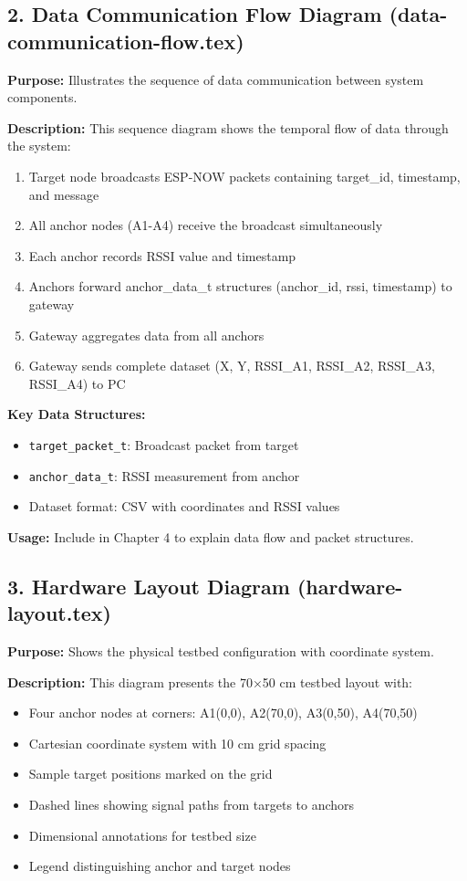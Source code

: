 \subsection*{2. Data Communication Flow Diagram (data-communication-flow.tex)}
\textbf{Purpose:} Illustrates the sequence of data communication between system components.

\textbf{Description:}
This sequence diagram shows the temporal flow of data through the system:
\begin{enumerate}
    \item Target node broadcasts ESP-NOW packets containing target\_id, timestamp, and message
    \item All anchor nodes (A1-A4) receive the broadcast simultaneously
    \item Each anchor records RSSI value and timestamp
    \item Anchors forward anchor\_data\_t structures (anchor\_id, rssi, timestamp) to gateway
    \item Gateway aggregates data from all anchors
    \item Gateway sends complete dataset (X, Y, RSSI\_A1, RSSI\_A2, RSSI\_A3, RSSI\_A4) to PC
\end{enumerate}

\textbf{Key Data Structures:}
\begin{itemize}
    \item \texttt{target\_packet\_t}: Broadcast packet from target
    \item \texttt{anchor\_data\_t}: RSSI measurement from anchor
    \item Dataset format: CSV with coordinates and RSSI values
\end{itemize}

\textbf{Usage:} Include in Chapter 4 to explain data flow and packet structures.

\subsection*{3. Hardware Layout Diagram (hardware-layout.tex)}
\textbf{Purpose:} Shows the physical testbed configuration with coordinate system.

\textbf{Description:}
This diagram presents the 70×50 cm testbed layout with:
\begin{itemize}
    \item Four anchor nodes at corners: A1(0,0), A2(70,0), A3(0,50), A4(70,50)
    \item Cartesian coordinate system with 10 cm grid spacing
    \item Sample target positions marked on the grid
    \item Dashed lines showing signal paths from targets to anchors
    \item Dimensional annotations for testbed size
    \item Legend distinguishing anchor and target nodes
\end{itemize}

